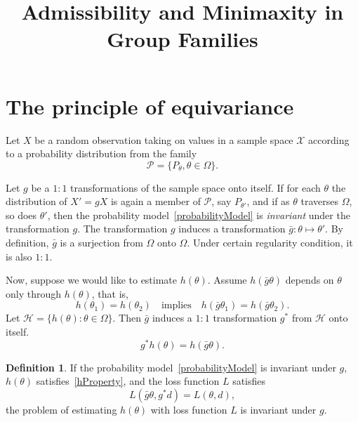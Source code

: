 \documentclass{article}
\theoremstyle{plain}
\theoremstyle{definition}
\newtheorem{definition}{Definition}
\begin{document}
\title{Admissibility and Minimaxity in Group Families}
\maketitle
\section{The principle of equivariance}
Let $X$ be a random observation taking on values in a sample space $\mathcal{X}$ according to a probability distribution from the family
\begin{equation}\label{probabilityModel}
\mathcal{P}=\{P_{\theta},\theta\in\Omega\}.
\end{equation}

Let $g$ be a $1:1$ transformations of the sample space onto itself.
If for each $\theta$ the distribution of $X'=g X$ is again a member of $\mathcal{P}$, say $P_{\theta'}$, and if as $\theta$ traverses $\Omega$, so does $\theta'$, then the probability model~\eqref{probabilityModel} is \emph{invariant} under the transformation $g$.
The transformation $g$ induces a transformation $\bar{g}:\theta\mapsto \theta'$.
By definition, $\bar{g}$ is a surjection from $\Omega$ onto $\Omega$. Under certain regularity condition, it is also $1:1$.

Now, suppose we would like to estimate $h(\theta)$. Assume $h(\bar{g}\theta)$ depends on $\theta$ only through $h(\theta)$, that is,
\begin{equation}\label{hProperty}
    h(\theta_1)=h(\theta_2)\quad \textrm{implies}\quad h(\bar{g}\theta_1)=h(\bar{g}\theta_2).
\end{equation}
Let $\mathcal{H}=\{h(\theta):\theta\in\Omega\}$. Then $\bar{g}$ induces a $1:1$ transformation $g^*$ from $\mathcal{H}$ onto itself.
\begin{equation*}
    g^* h(\theta)=h(\bar{g}\theta).
\end{equation*}
\begin{definition}
    If the probability model~\eqref{probabilityModel} is invariant under $g$,
        $h(\theta)$ satisfies~\eqref{hProperty}, and
    the loss function $L$ satisfies
    \begin{equation*}
        L(\bar{g}\theta, g^* d)=L(\theta,d),
    \end{equation*}
    the problem of estimating $h(\theta)$ with loss function $L$ is invariant under $g$.
\end{definition}
\end{document}

